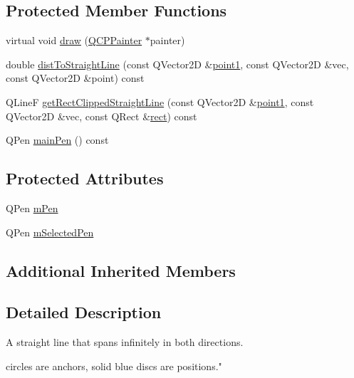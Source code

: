 \subsection*{Protected Member Functions}
\begin{DoxyCompactItemize}
\item 
virtual void \hyperlink{class_q_c_p_item_straight_line_a2daa1e1253216c26565d56a2d5530170}{draw} (\hyperlink{class_q_c_p_painter}{Q\+C\+P\+Painter} $\ast$painter)
\item 
double \hyperlink{class_q_c_p_item_straight_line_adc9b6c5bd33c7f806b748b79dfa25926}{dist\+To\+Straight\+Line} (const Q\+Vector2\+D \&\hyperlink{class_q_c_p_item_straight_line_ac131a6ffe456f2cc7364dce541fe0120}{point1}, const Q\+Vector2\+D \&vec, const Q\+Vector2\+D \&point) const 
\item 
Q\+Line\+F \hyperlink{class_q_c_p_item_straight_line_af18ac29577b5b96fece15b0ffea70177}{get\+Rect\+Clipped\+Straight\+Line} (const Q\+Vector2\+D \&\hyperlink{class_q_c_p_item_straight_line_ac131a6ffe456f2cc7364dce541fe0120}{point1}, const Q\+Vector2\+D \&vec, const Q\+Rect \&\hyperlink{_gen_blob_8m_aea8f6815d9a63491fc422c5572c6b3c3}{rect}) const 
\item 
Q\+Pen \hyperlink{class_q_c_p_item_straight_line_a63ef39814c5b560dbb7b13e3fec1d940}{main\+Pen} () const 
\end{DoxyCompactItemize}
\subsection*{Protected Attributes}
\begin{DoxyCompactItemize}
\item 
Q\+Pen \hyperlink{class_q_c_p_item_straight_line_a15106ddc2ebd73ed5c1bc57aa92bee8f}{m\+Pen}
\item 
Q\+Pen \hyperlink{class_q_c_p_item_straight_line_a0307a0d56a018656adbf798bc84c2a4b}{m\+Selected\+Pen}
\end{DoxyCompactItemize}
\subsection*{Additional Inherited Members}


\subsection{Detailed Description}
A straight line that spans infinitely in both directions. 

 circles are anchors, solid blue discs are positions."

